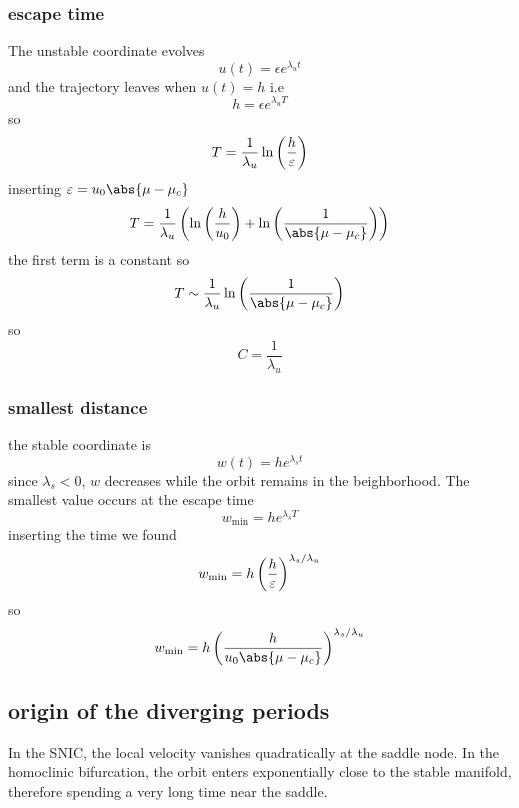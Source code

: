 \subsubsection{escape time}
The unstable coordinate evolves
\begin{equation}
    u(t)=\epsilon e^{\lambda_u t}
\end{equation}
and the trajectory leaves when \(u(t)=h\) i.e 
\begin{equation}
    h=\epsilon e^{\lambda_u T}
\end{equation}
so 
\begin{equation}
    T = \frac{1}{\lambda_u}\ln\left(\frac{h}{\varepsilon}\right)
\end{equation}
inserting \(\epsilon=u_0\abs{\mu-\mu_c}\)
\begin{equation}
    T = \frac{1}{\lambda_u}\ins{\ln\ins{\frac{h}{u_0}}+\ln\ins{\frac{1}{\abs{\mu-\mu_c}}}}
\end{equation}
the first term is a constant so 
\begin{equation}
    T \sim \frac{1}{\lambda_u}\ln\ins{\frac{1}{\abs{\mu-\mu_c}}}
\end{equation}
so 
\begin{equation}
    C = \frac{1}{\lambda_u}
\end{equation}
\subsubsection{smallest distance}
the stable coordinate is 
\begin{equation}
    w(t)=he^{\lambda_s t}
\end{equation}
since \(\lambda_s<0\), \(w\) decreases while the orbit remains in the beighborhood. The smallest value occurs at the escape time 
\begin{equation}
    w_{\min}=he^{\lambda_s T}
\end{equation}
inserting the time we found 
\begin{equation}
    w_{\min}=h\left(\frac{h}{\varepsilon}\right)^{\lambda_s/\lambda_u}
\end{equation}
so 
\begin{equation}
    w_{\min} = h\ins{\frac{h}{u_0\abs{\mu-\mu_c}}}^{\lambda_s/\lambda_u}
\end{equation}
\subsection{origin of the diverging periods}
In the SNIC, the local velocity vanishes quadratically at the saddle node. In the homoclinic bifurcation, the orbit enters exponentially close to the stable manifold, therefore spending a very long time near the saddle.